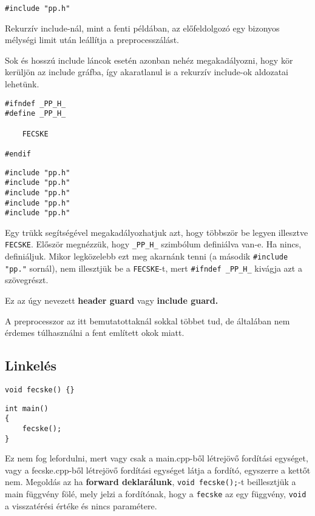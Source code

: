 \documentclass[a4paper,11.5pt,table]{article}
\begin{document}
	\begin{lstlisting}
#include "pp.h"
	\end{lstlisting}
		
	Rekurzív include-nál, mint a fenti példában, az előfeldolgozó egy bizonyos mélységi limit után leállítja a preprocesszálást.
	
	Sok és hosszú include láncok esetén azonban nehéz megakadályozni, hogy kör kerüljön az include gráfba, így akaratlanul is a rekurzív include-ok aldozatai lehetünk.
	\bigskip
	
	\begin{lstlisting}
#ifndef _PP_H_
#define _PP_H_

	FECSKE

#endif
	\end{lstlisting}
	
	\begin{lstlisting}
#include "pp.h"
#include "pp.h"
#include "pp.h"
#include "pp.h"
#include "pp.h"
	\end{lstlisting}
	
	Egy trükk segítségével megakadályozhatjuk azt, hogy többször be legyen illesztve \texttt{FECSKE}. Először megnézzük, hogy \texttt{\_PP\_H\_} szimbólum definiálva van-e. Ha nincs, definiáljuk. Mikor legközelebb ezt meg akarnánk tenni (a második \texttt{\#include "pp."} sornál), nem illesztjük be a \texttt{FECSKE}-t, mert \texttt{\#ifndef \_PP\_H\_} kivágja azt a szövegrészt.
	
	Ez az úgy nevezett \textbf{header guard} vagy \textbf{include guard.}
	
	\medskip
	A preprocesszor az itt bemutatottaknál sokkal többet tud, de általában nem érdemes túlhasználni a fent említett okok miatt.
	
	\subsection{Linkelés}
	\bigskip
	
	\begin{lstlisting}
void fecske() {}
	\end{lstlisting}
	\bigskip
	
	\begin{lstlisting}
int main()
{
	fecske();
}
	\end{lstlisting}
		
	Ez nem fog lefordulni, mert vagy csak a main.cpp-ből létrejövő fordítási egységet, vagy a fecske.cpp-ből létrejövő fordítási egységet látja a fordító, egyszerre a kettőt nem. Megoldás az ha \textbf{forward deklarálunk}, \texttt{void fecske();}-t beillesztjük a main függvény fölé, mely jelzi a fordítónak, hogy a \texttt{fecske} az egy függvény, \texttt{void} a visszatérési értéke és nincs paramétere. 
	\medskip
	
\end{document}
